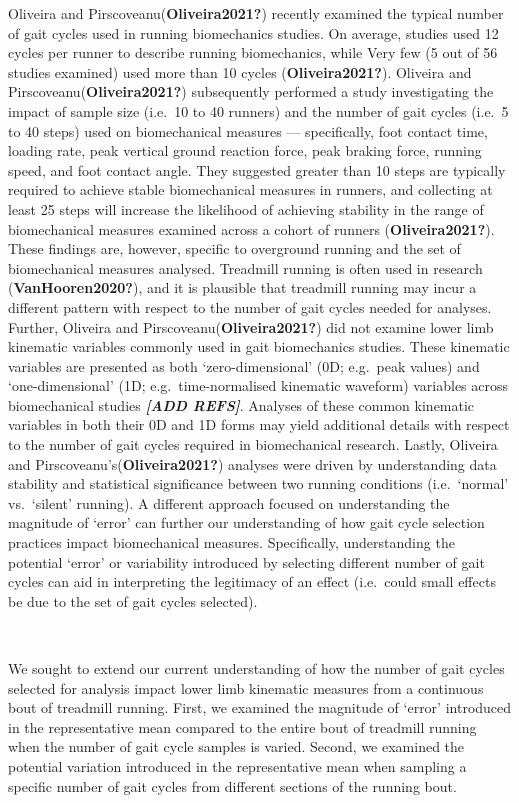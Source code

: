 \documentclass[]{elsarticle} %
\begin{document}
Oliveira and Pirscoveanu(\textbf{Oliveira2021?}) recently examined the
typical number of gait cycles used in running biomechanics studies. On
average, studies used 12 cycles per runner to describe running
biomechanics, while Very few (5 out of 56 studies examined) used more
than 10 cycles (\textbf{Oliveira2021?}). Oliveira and
Pirscoveanu(\textbf{Oliveira2021?}) subsequently performed a study
investigating the impact of sample size (i.e.~10 to 40 runners) and the
number of gait cycles (i.e.~5 to 40 steps) used on biomechanical
measures --- specifically, foot contact time, loading rate, peak
vertical ground reaction force, peak braking force, running speed, and
foot contact angle. They suggested greater than 10 steps are typically
required to achieve stable biomechanical measures in runners, and
collecting at least 25 steps will increase the likelihood of achieving
stability in the range of biomechanical measures examined across a
cohort of runners (\textbf{Oliveira2021?}). These findings are, however,
specific to overground running and the set of biomechanical measures
analysed. Treadmill running is often used in research
(\textbf{VanHooren2020?}), and it is plausible that treadmill running
may incur a different pattern with respect to the number of gait cycles
needed for analyses. Further, Oliveira and
Pirscoveanu(\textbf{Oliveira2021?}) did not examine lower limb kinematic
variables commonly used in gait biomechanics studies. These kinematic
variables are presented as both `zero-dimensional' (0D; e.g.~peak
values) and `one-dimensional' (1D; e.g.~time-normalised kinematic
waveform) variables across biomechanical studies \textbf{\emph{{[}ADD
REFS{]}}}. Analyses of these common kinematic variables in both their 0D
and 1D forms may yield additional details with respect to the number of
gait cycles required in biomechanical research. Lastly, Oliveira and
Pirscoveanu's(\textbf{Oliveira2021?}) analyses were driven by
understanding data stability and statistical significance between two
running conditions (i.e.~`normal' vs.~`silent' running). A different
approach focused on understanding the magnitude of `error' can further
our understanding of how gait cycle selection practices impact
biomechanical measures. Specifically, understanding the potential
`error' or variability introduced by selecting different number of gait
cycles can aid in interpreting the legitimacy of an effect (i.e.~could
small effects be due to the set of gait cycles selected).

~

We sought to extend our current understanding of how the number of gait
cycles selected for analysis impact lower limb kinematic measures from a
continuous bout of treadmill running. First, we examined the magnitude
of `error' introduced in the representative mean compared to the entire
bout of treadmill running when the number of gait cycle samples is
varied. Second, we examined the potential variation introduced in the
representative mean when sampling a specific number of gait cycles from
different sections of the running bout.
\end{document}
